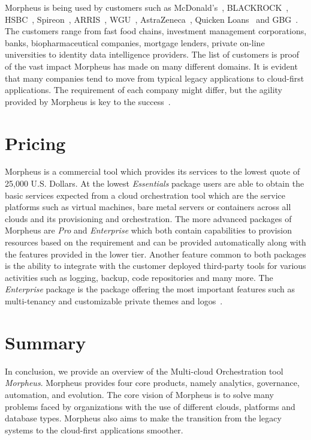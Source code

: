 Morpheus is being used by customers such as
McDonald's~\cite{hid-sp18-416-www-mcdonalds},
BLACKROCK~\cite{hid-sp18-416-www-blackrock}, HSBC~\cite{hid-sp18-416-www-hsbc},
Spireon~\cite{hid-sp18-416-www-spireon}, ARRIS~\cite{hid-sp18-416-www-arris},
WGU~\cite{hid-sp18-416-www-wgu},
AstraZeneca~\cite{hid-sp18-416-www-astrazeneca}, Quicken
Loans~\cite{hid-sp18-416-www-quickenloans} and GBG~\cite{hid-sp18-416-www-gbg}.
The customers range from fast food chains, investment management corporations,
banks, biopharmaceutical companies, mortgage lenders, private on-line
universities to identity data intelligence providers. The list of customers is
proof of the vast impact Morpheus has made on many different domains. It is
evident that many companies tend to move from typical legacy applications to
cloud-first applications. The requirement of each company might differ, but the
agility provided by Morpheus is key to the
success~\cite{hid-sp18-416-www-morpheus-customers}.

\section{Pricing} 
\label{sec:pricing}

Morpheus is a commercial tool which provides its services to the lowest quote
of 25,000 U.S. Dollars. At the lowest \textit{Essentials} package users are
able to obtain the basic services expected from a cloud orchestration tool
which are the service platforms such as virtual machines, bare metal servers or
containers across all clouds and its provisioning and orchestration. The more
advanced packages of Morpheus are \textit{Pro} and \textit{Enterprise} which
both contain capabilities to provision resources based on the requirement and
can be provided automatically along with the features provided in the lower
tier. Another feature common to both packages is the ability to integrate with
the customer deployed third-party tools for various activities such as logging,
backup, code repositories and many more. The \textit{Enterprise} package is the
package offering the most important features such as multi-tenancy and
customizable private themes and logos~\cite{hid-sp18-416-www-morpheus-pricing}.

\section{Summary} 
\label{sec:summary}

In conclusion, we provide an overview of the Multi-cloud Orchestration tool
\textit{Morpheus}. Morpheus provides four core products, namely analytics,
governance, automation, and evolution. The core vision of Morpheus is to solve
many problems faced by organizations with the use of different clouds,
platforms and database types. Morpheus also aims to make the transition from
the legacy systems to the cloud-first applications smoother.

